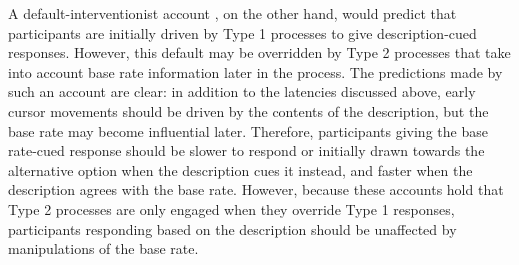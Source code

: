 A default-interventionist account
\citep{Evans2007,Evans2006,Kahneman2002,Kahneman2005}, on the other hand,
would predict that participants are initially driven by Type 1 processes
to give description-cued responses.
However, this default may be overridden by Type 2 processes
that take into account base rate information later in the process.
The predictions made by such an account are clear:
in addition to the latencies discussed above,
early cursor movements should be driven by the contents of the description,
but the base rate may become influential later.
Therefore, participants giving the base rate-cued response
should be slower to respond or initially drawn towards the alternative option
when the description cues it instead,
and faster when the description agrees with the base rate.
However, because these accounts hold that
Type 2 processes are only engaged when they override Type 1 responses,
participants responding based on the description
should be unaffected by manipulations of the base rate.

